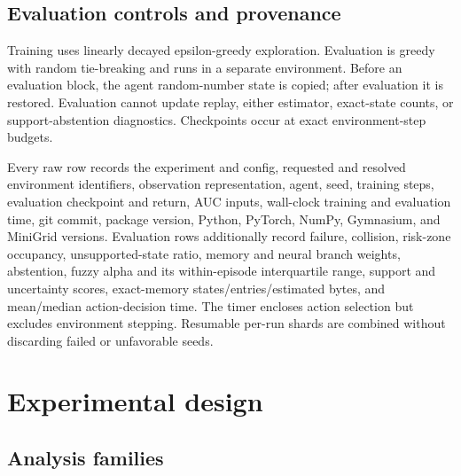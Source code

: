 \documentclass[preprint,12pt]{elsarticle}
\begin{document}
\subsection{Evaluation controls and provenance}

Training uses linearly decayed epsilon-greedy exploration. Evaluation is
greedy with random tie-breaking and runs in a separate environment. Before an
evaluation block, the agent random-number state is copied; after evaluation it
is restored. Evaluation cannot update replay, either estimator, exact-state
counts, or support-abstention diagnostics. Checkpoints occur at exact
environment-step budgets.

Every raw row records the experiment and config, requested and resolved
environment identifiers, observation representation, agent, seed, training
steps, evaluation checkpoint and return, AUC inputs, wall-clock training and
evaluation time, git commit, package version, Python, PyTorch, NumPy,
Gymnasium, and MiniGrid versions. Evaluation rows additionally record failure,
collision, risk-zone occupancy, unsupported-state ratio, memory and neural
branch weights, abstention, fuzzy alpha and its within-episode interquartile
range, support and uncertainty scores, exact-memory states/entries/estimated
bytes, and mean/median action-decision time. The timer encloses action
selection but excludes environment stepping. Resumable per-run shards are
combined without discarding failed or unfavorable seeds.

\section{Experimental design}
\label{sec:design}

\subsection{Analysis families}
\end{document}
